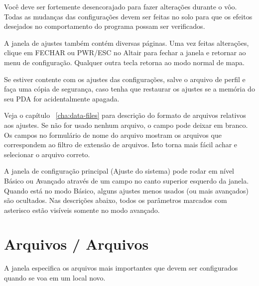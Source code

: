 Você deve ser fortemente desencorajado para fazer alterações durante o vôo.  Todas as mudanças das configurações devem ser feitas no solo para que os efeitos desejados no comportamento do programa possam ser verificados.

A janela de ajustes também contém diversas páginas.  Uma vez feitas alterações, clique em FECHAR ou PWR/ESC no Altair para fechar a janela e retornar ao menu de configuração.  Qualquer outra tecla retorna ao modo normal de mapa.

\tip Se estiver contente com os ajustes das configurações, salve o arquivo de perfil e faça uma cópia de segurança, caso tenha que restaurar os ajustes se a memória do seu PDA for acidentalmente apagada.

Veja o capítulo ~\ref{cha:data-files} para descrição do formato de arquivos relativos aos ajustes.  Se não for usado nenhum arquivo, o campo pode deixar em branco.  Os campos no formulário de nome do arquivo mostram os arquivos que correspondem ao filtro de extensão de arquivos.  Isto torna mais fácil achar e selecionar o arquivo correto.

A janela de configuração principal (Ajuste do sistema) pode rodar em nível Básico ou Avançado através de um campo no canto superior esquerdo da janela.  
Quando está no modo Básico, alguns ajustes menos usados (ou mais avançados) são ocultados.  Nas descrições abaixo, todos os parâmetros marcados com asterisco estão visíveis somente no modo avançado.

\section{Arquivos / Arquivos}
A janela especifica os arquivos mais importantes que devem ser configurados quando se voa em um local novo.


